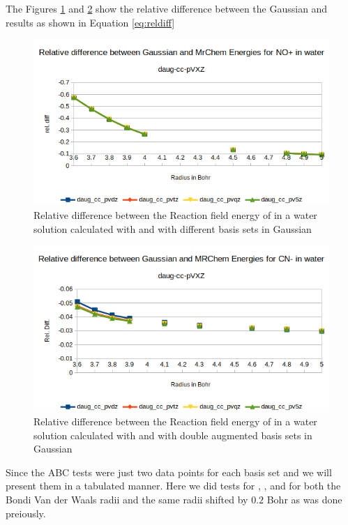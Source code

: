 \documentclass[../master_thesis.tex]{subfiles}
\begin{document}
The Figures \ref{fig:nopreldiffdaug} and \ref{fig:cyanreldiffdaug} show the relative
difference between the Gaussian and \mrchem results as shown in Equation \ref{eq:reldiff}


\begin{figure}[h!]
  \centering
    \includegraphics[width=\linewidth]{img/nopdaugreldiff.png}
    \caption{Relative difference between the Reaction field energy of  in a water solution calculated with \mrchem
  and with different basis sets in Gaussian}
  \label{fig:nopreldiffdaug}
\end{figure}

\begin{figure}[h!]
  \centering
    \includegraphics[width=\linewidth]{img/cyandaugreldiff.png}
  \caption{Relative difference between the Reaction field energy of  in a water solution calculated with \mrchem
  and with double augmented basis sets in Gaussian}
  \label{fig:cyanreldiffdaug}
\end{figure}

Since the \ac{ABC} tests were just two data points for each basis set and \newline\mrchem
we will present them in a tabulated manner. Here we did tests for , ,  and 
for both the Bondi Van der Waals radii and the same radii shifted by $0.2$ Bohr as was done preiously.
\end{document}
